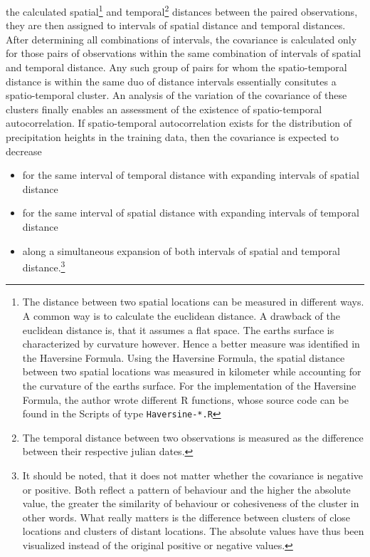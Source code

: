 \documentclass[
  12pt,
]{article}
\begin{document}
the calculated
spatial\footnote{The distance between two spatial locations can be measured in different ways. A common way is to calculate the euclidean distance. A drawback of the euclidean distance is, that it assumes a flat space. The earths surface is characterized by curvature however. Hence a better measure was identified in the Haversine Formula. Using the Haversine Formula, the spatial distance between two spatial locations was measured in kilometer while accounting for the curvature of the earths surface. For the implementation of the Haversine Formula, the author wrote different R functions, whose source code can be found in the Scripts of type \texttt{Haversine-*.R}}
and
temporal\footnote{The temporal distance between two observations is measured as the difference between their respective julian dates.}
distances between the paired observations, they are then assigned to
intervals of spatial distance and temporal distances. After determining
all combinations of intervals, the covariance is calculated only for
those pairs of observations within the same combination of intervals of
spatial and temporal distance. Any such group of pairs for whom the
spatio-temporal distance is within the same duo of distance intervals
essentially consitutes a spatio-temporal cluster. An analysis of the
variation of the covariance of these clusters finally enables an
assessment of the existence of spatio-temporal autocorrelation. If
spatio-temporal autocorrelation exists for the distribution of
precipitation heights in the training data, then the covariance is
expected to decrease

\begin{itemize}[label={}]
\item for the same interval of temporal distance with expanding intervals of spatial distance
\item for the same interval of spatial distance with expanding intervals of temporal distance
\item along a simultaneous expansion of both intervals of spatial and temporal distance.\footnote{It should be noted, that it does not matter whether the covariance is negative or positive. Both reflect a pattern of behaviour and the higher the absolute value, the greater the similarity of behaviour or cohesiveness of the cluster in other words. What really matters is the difference between clusters of close locations and clusters of distant locations. The absolute values have thus been visualized instead of the original positive or negative values.} 
\end{itemize}
\end{document}
